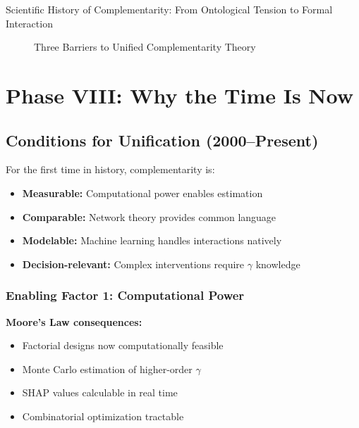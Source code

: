 \begin{chapter}{Scientific History of Complementarity: From Ontological Tension to Formal Interaction}
\begin{figure}[h]
\caption{Three Barriers to Unified Complementarity Theory}
\label{fig:three-barriers}
\end{figure}

\section{Phase VIII: Why the Time Is Now}
\label{sec:phase-viii}

\subsection{Conditions for Unification (2000--Present)}

\begin{tcolorbox}[colback=green!5!white,colframe=green!75!black,title=\textbf{Historical Diagnosis}]
For the first time in history, complementarity is:
\begin{itemize}[noitemsep]
    \item \textbf{Measurable:} Computational power enables estimation
    \item \textbf{Comparable:} Network theory provides common language
    \item \textbf{Modelable:} Machine learning handles interactions natively
    \item \textbf{Decision-relevant:} Complex interventions require $\gamma$ knowledge
\end{itemize}
\end{tcolorbox}

\subsubsection{Enabling Factor 1: Computational Power}

\textbf{Moore's Law consequences:}
\begin{itemize}[noitemsep]
    \item Factorial designs now computationally feasible
    \item Monte Carlo estimation of higher-order $\gamma$
    \item SHAP values calculable in real time
    \item Combinatorial optimization tractable
\end{itemize}


\end{chapter}
